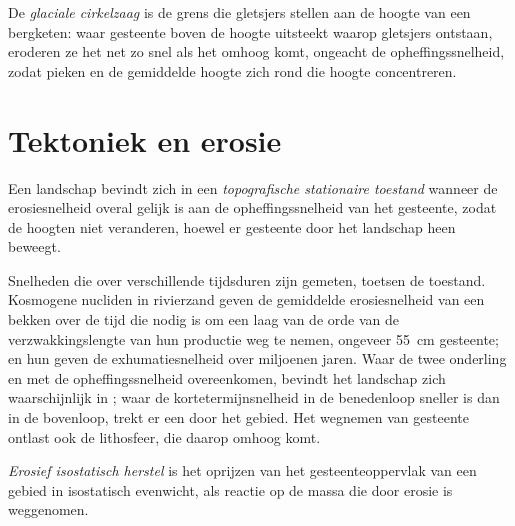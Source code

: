 \begin{definition}\label{def:b3:quantitative-geomorphology:buzzsaw}
De \emph{glaciale cirkelzaag} is de grens die gletsjers stellen aan de
hoogte van een bergketen: waar gesteente boven de hoogte uitsteekt waarop gletsjers ontstaan,
eroderen ze het net zo snel als het omhoog komt, ongeacht de opheffingssnelheid, zodat pieken en de
gemiddelde hoogte zich rond die hoogte concentreren.
\end{definition}

\section{Tektoniek en erosie}\label{sec:b3:quantitative-geomorphology:tectonics}

\begin{definition}\label{def:b3:quantitative-geomorphology:steady-state}
Een landschap bevindt zich in een \emph{topografische stationaire toestand}
wanneer de erosiesnelheid overal gelijk is aan de opheffingssnelheid van het gesteente, zodat
de hoogten niet veranderen, hoewel er gesteente door het landschap heen beweegt.
\end{definition}

Snelheden die over verschillende tijdsduren zijn gemeten, toetsen de toestand. Kosmogene nucliden in
rivierzand geven de gemiddelde erosiesnelheid van een bekken over de tijd
die nodig is om een laag van de orde van de verzwakkingslengte van hun
productie weg te nemen, ongeveer \qty{55}{cm} gesteente;  en hun
 geven de exhumatiesnelheid over miljoenen jaren. Waar de twee
onderling en met de opheffingssnelheid overeenkomen, bevindt het landschap zich waarschijnlijk
in ; waar de kortetermijnsnelheid in de benedenloop sneller is dan in de bovenloop,
trekt er een  door het gebied. Het wegnemen van gesteente ontlast ook de
lithosfeer, die daarop omhoog komt.

\begin{definition}\label{def:b3:quantitative-geomorphology:rebound}
\emph{Erosief isostatisch herstel} is
het oprijzen van het gesteenteoppervlak van een gebied in isostatisch evenwicht, als reactie op
de massa die door erosie is weggenomen.
\end{definition}

